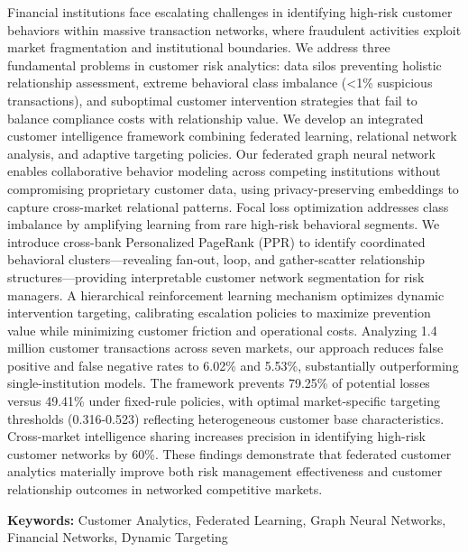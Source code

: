 \documentclass[11pt,english]{article}
\begin{document}
{\noindent Financial institutions face escalating challenges in identifying high-risk customer behaviors within massive transaction networks, where fraudulent activities exploit market fragmentation and institutional boundaries. We address three fundamental problems in customer risk analytics: data silos preventing holistic relationship assessment, extreme behavioral class imbalance (<1\% suspicious transactions), and suboptimal customer intervention strategies that fail to balance compliance costs with relationship value. We develop an integrated customer intelligence framework combining federated learning, relational network analysis, and adaptive targeting policies. Our federated graph neural network enables collaborative behavior modeling across competing institutions without compromising proprietary customer data, using privacy-preserving embeddings to capture cross-market relational patterns. Focal loss optimization addresses class imbalance by amplifying learning from rare high-risk behavioral segments. We introduce cross-bank Personalized PageRank (PPR) to identify coordinated behavioral clusters—revealing fan-out, loop, and gather-scatter relationship structures—providing interpretable customer network segmentation for risk managers. A hierarchical reinforcement learning mechanism optimizes dynamic intervention targeting, calibrating escalation policies to maximize prevention value while minimizing customer friction and operational costs. Analyzing 1.4 million customer transactions across seven markets, our approach reduces false positive and false negative rates to 6.02\% and 5.53\%, substantially outperforming single-institution models. The framework prevents 79.25\% of potential losses versus 49.41\% under fixed-rule policies, with optimal market-specific targeting thresholds (0.316-0.523) reflecting heterogeneous customer base characteristics. Cross-market intelligence sharing increases precision in identifying high-risk customer networks by 60\%. These findings demonstrate that federated customer analytics materially improve both risk management effectiveness and customer relationship outcomes in networked competitive markets.
}


\vspace{1em} 
\textbf{Keywords:} Customer Analytics, Federated Learning, Graph Neural Networks, Financial Networks, Dynamic Targeting  

\newpage


\end{document}
